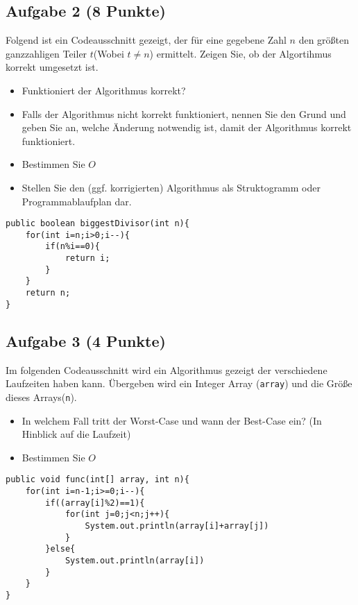 \documentclass[a4paper,
			   fontsize=12pt]{article}
\begin{document}
\vspace{6cm}

\subsection*{Aufgabe 2 (8 Punkte)}
Folgend ist ein Codeausschnitt gezeigt, der für eine gegebene Zahl $n$ den größten ganzzahligen Teiler $t$(Wobei $t\ne n$) ermittelt. Zeigen Sie, ob der Algortihmus korrekt umgesetzt ist.
\begin{itemize}
	\item Funktioniert der Algorithmus korrekt?
	\item Falls der Algorithmus nicht korrekt funktioniert, nennen Sie den Grund und geben Sie an, welche Änderung notwendig ist, damit der Algorithmus korrekt funktioniert.
	\item Bestimmen Sie $O$
	\item Stellen Sie den (ggf. korrigierten) Algorithmus als Struktogramm oder Programmablaufplan dar.
\end{itemize}

\lstset{style=java}
\begin{lstlisting}
public boolean biggestDivisor(int n){
	for(int i=n;i>0;i--){
		if(n%i==0){
			return i;
		}
	}
	return n;
}
\end{lstlisting}

\vspace{7,5cm}

\subsection*{Aufgabe 3 (4 Punkte)}
Im folgenden Codeausschnitt wird ein Algorithmus gezeigt der verschiedene Laufzeiten haben kann. Übergeben wird ein Integer Array (\texttt{array}) und die Größe dieses
Arrays(\texttt{n}).
\begin{itemize}
	\item In welchem Fall tritt der Worst-Case und wann der Best-Case ein? (In Hinblick auf die Laufzeit)
	\item Bestimmen Sie $O$
\end{itemize}  

\begin{lstlisting}
public void func(int[] array, int n){
    for(int i=n-1;i>=0;i--){
		if((array[i]%2)==1){
			for(int j=0;j<n;j++){
				System.out.println(array[i]+array[j])
			}
        }else{
			System.out.println(array[i])
        }
    }
}
\end{lstlisting}
\end{document}
